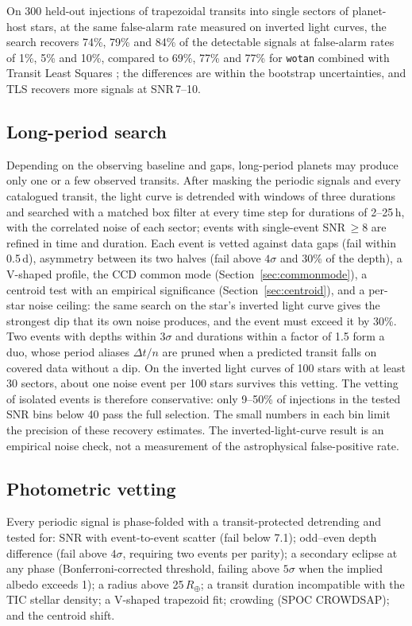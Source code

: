 \documentclass{aastex701}
\begin{document}
On 300 held-out injections of trapezoidal transits into single sectors of planet-host stars, at the
same false-alarm rate measured on inverted light curves, the search recovers 74\%, 79\% and 84\% of
the detectable signals at false-alarm rates of 1\%, 5\% and 10\%, compared to 69\%, 77\% and 77\% for
\texttt{wotan} combined with Transit Least Squares \citep[TLS;][]{Hippke2019b}; the differences are
within the bootstrap uncertainties, and TLS recovers more signals at SNR\,7--10.

\subsection{Long-period search}
Depending on the observing baseline and gaps, long-period planets may produce only one or a few
observed transits. After masking
the periodic signals and every catalogued transit, the light curve is detrended with windows of
three durations and searched with a matched box filter at every time step for durations of 2--25\,h,
with the correlated noise of each sector; events with single-event SNR\,$\geq 8$ are refined in time
and duration. Each event is vetted against data gaps (fail within 0.5\,d), asymmetry between its two
halves (fail above $4\sigma$ and 30\% of the depth), a V-shaped profile, the CCD common mode
(Section~\ref{sec:commonmode}), a centroid test with an empirical significance
(Section~\ref{sec:centroid}), and a per-star noise ceiling: the same search on the star's inverted
light curve gives the strongest dip that its own noise produces, and the event must exceed it by
30\%. Two events with depths within $3\sigma$ and durations within a factor of 1.5 form a duo, whose
period aliases $\Delta t/n$ are pruned when a predicted transit falls on covered data without a dip.
On the inverted light curves of 100 stars with at least 30 sectors, about one noise event per 100
stars survives this vetting.  The vetting of isolated events is
therefore conservative: only 9--50\% of injections in the tested SNR bins below 40 pass the full
selection. The small numbers in each bin limit the precision of these recovery estimates.
The inverted-light-curve result is an empirical noise check, not a measurement of the astrophysical
false-positive rate.

\subsection{Photometric vetting}\label{sec:vetting}
Every periodic signal is phase-folded with a transit-protected detrending and tested for: SNR with
event-to-event scatter (fail below 7.1); odd--even depth difference (fail above $4\sigma$, requiring
two events per parity); a secondary eclipse at any phase (Bonferroni-corrected threshold, failing above
$5\sigma$ when the implied albedo exceeds 1); a radius above 25\,$R_\oplus$; a transit duration
incompatible with the TIC stellar density; a V-shaped trapezoid fit; crowding (SPOC CROWDSAP);
and the centroid shift.
\end{document}
